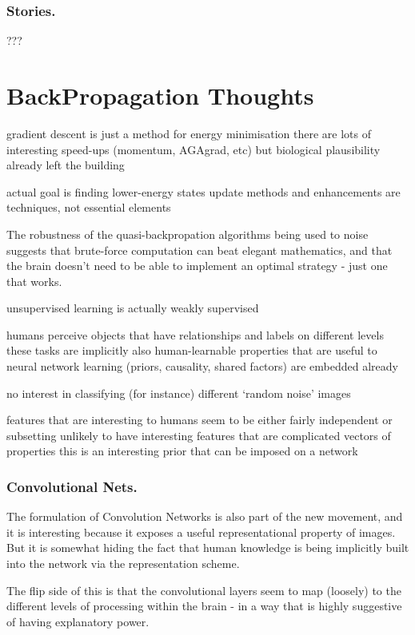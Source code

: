 \documentclass[citeauthoryear]{llncs}
\begin{document}
\subsubsection*{Stories.}
  ???


\section{BackPropagation Thoughts}
  gradient descent is just a method for energy minimisation
    there are lots of interesting speed-ups (momentum, AGAgrad, etc)
      but biological plausibility already left the building
      
    actual goal is finding lower-energy states
      update methods and enhancements are techniques, not essential elements




The robustness of the quasi-backpropation algorithms being used to noise
suggests that brute-force computation can beat elegant mathematics, and that 
the brain doesn't need to be able to implement an optimal strategy - just one that works.


unsupervised learning is actually weakly supervised 

  humans perceive objects that have relationships and labels on different levels
    these tasks are implicitly also human-learnable
    properties that are useful to neural network learning (priors, causality, shared factors) are embedded already
    
  no interest in classifying (for instance) different `random noise' images
  
  features that are interesting to humans seem to be either fairly independent or subsetting
    unlikely to have interesting features that are complicated vectors of properties
    this is an interesting prior that can be imposed on a network

\subsubsection*{Convolutional Nets.}
The formulation of Convolution Networks is also part of the new movement, 
and it is interesting because it exposes a useful representational property of images.  
But it is somewhat hiding the fact that human knowledge is being implicitly 
built into the network via the representation scheme.

The flip side of this is that the convolutional layers seem to 
map (loosely) to the different levels of processing within the brain - 
in a way that is highly suggestive of having explanatory power.
\end{document}

